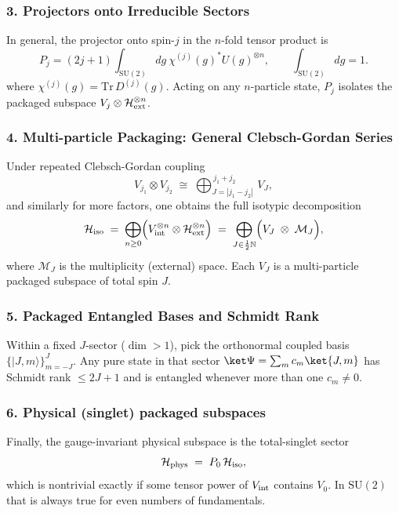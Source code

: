 \documentclass[12pt,a4paper]{article}
\begin{document}
\subsubsection*{3. Projectors onto Irreducible Sectors}

In general, the projector onto spin-$j$ in the $n$-fold tensor product is
$$
P_j = (2j+1) \int_{\mathrm{SU}(2)} dg ~ \chi^{(j)}(g)^* U(g)^{\otimes n},
\qquad \int_{\mathrm{SU}(2)} dg = 1.
$$
where $\chi^{(j)}(g)=\mathrm{Tr}\,D^{(j)}(g)$.
Acting on any $n$-particle state, $P_j$ isolates the packaged subspace $V_j\otimes \mathcal H_{\rm ext}^{\otimes n}$.



\subsubsection*{4. Multi-particle Packaging: General Clebsch-Gordan Series}

Under repeated Clebsch-Gordan coupling
\[
V_{j_1}\otimes V_{j_2}
\;\cong\;
\bigoplus_{J=|j_1-j_2|}^{\,j_1+j_2}\,V_J,
\]
and similarly for more factors, one obtains the full isotypic decomposition
\[
\mathcal H_{\rm iso}
\;=\;
\bigoplus_{n\ge0}
\Bigl(V_{\rm int}^{\otimes n}\otimes\mathcal H_{\rm ext}^{\otimes n}\Bigr)
\;=\;
\bigoplus_{J\in\frac12\mathbb N}
\Bigl(V_J\;\otimes\;\mathcal M_J\Bigr),
\]
where $\mathcal M_J$ is the multiplicity (external) space.
Each $V_J$ is a multi-particle packaged subspace of total spin $J$.



\subsubsection*{5. Packaged Entangled Bases and Schmidt Rank}

Within a fixed $J$-sector ($\dim>1$), pick the orthonormal coupled basis $\{|J,m\rangle\}_{m=-J}^J$.  
Any pure state in that sector $\ket\Psi=\sum_m c_m\ket{J,m}$ has Schmidt rank $\le2J+1$ and is entangled whenever more than one $c_m\neq0$.



\subsubsection*{6. Physical (singlet) packaged subspaces}

Finally, the gauge-invariant physical subspace is the total-singlet sector
\[
\mathcal H_{\rm phys}
\;=\;
P_{0}\,\mathcal H_{\rm iso},
\]
which is nontrivial exactly if some tensor power of $V_{\rm int}$ contains $V_0$.
In $\mathrm{SU}(2)$ that is always true for even numbers of fundamentals.
\end{document}
